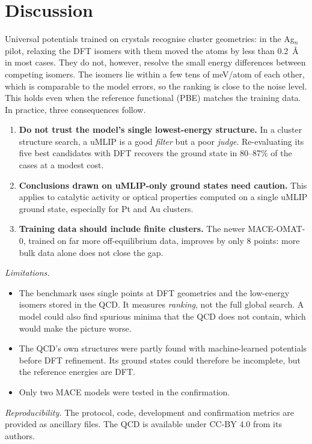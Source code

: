 \documentclass[11pt]{article}
\begin{document}
\section{Discussion}
Universal potentials trained on crystals recognise cluster geometries: in the Ag$_n$ pilot, relaxing the DFT isomers with them moved the
atoms by less than 0.2~\AA{} in most cases. They do not, however, resolve the small energy differences between
competing isomers. The isomers lie within a few tens of meV/atom of each other, which is comparable to the model
errors, so the ranking is close to the noise level. This holds even when the reference functional (PBE) matches
the training data. In practice, three consequences follow.
\begin{enumerate}
\item \textbf{Do not trust the model's single lowest-energy structure.} In a cluster structure search, a uMLIP is a
good \emph{filter} but a poor \emph{judge}. Re-evaluating its five best candidates with DFT recovers the ground
state in 80--87\% of the cases at a modest cost.
\item \textbf{Conclusions drawn on uMLIP-only ground states need caution.} This applies to catalytic activity or
optical properties computed on a single uMLIP ground state, especially for Pt and Au clusters.
\item \textbf{Training data should include finite clusters.} The newer MACE-OMAT-0, trained on far more
off-equilibrium data, improves by only 8 points: more bulk data alone does not close the gap.
\end{enumerate}

\textit{Limitations.}
\begin{itemize}
\item The benchmark uses single points at DFT geometries and the low-energy isomers stored in the QCD. It measures
\emph{ranking}, not the full global search. A model could also find spurious minima that the QCD does not contain,
which would make the picture worse.
\item The QCD's own structures were partly found with machine-learned potentials before DFT refinement. Its ground
states could therefore be incomplete, but the reference energies are DFT.
\item Only two MACE models were tested in the confirmation.
\end{itemize}

\textit{Reproducibility.} The protocol, code, development and confirmation metrics are provided as ancillary files.
The QCD is available under CC-BY 4.0 from its authors.
\end{document}
